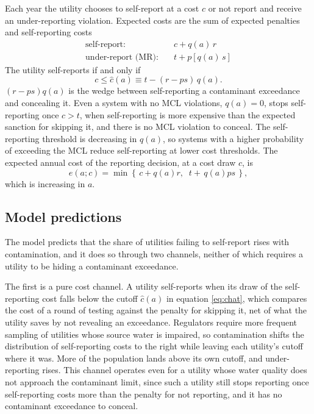 \documentclass[12pt]{article}
\begin{document}
	Each year the utility chooses to self-report at a cost $c$ or not report and receive an under-reporting violation. Expected costs are the sum of expected penalties and self-reporting costs
	\begin{align*}
		\text{self-report:} \quad & c + q(a)\,r \\
		\text{under-report (MR):} \quad & t + p\left[q(a)\,s\right]
	\end{align*}
	The utility self-reports if and only if
	\begin{equation}\label{eq:chat}
		c \le \hat{c}(a) \equiv t - (r - ps)\,q(a).
	\end{equation}
	$(r - ps)q(a)$ is the wedge between self-reporting a contaminant exceedance and concealing it. Even a system with no MCL violations, $q(a) = 0$, stops self-reporting once $c > t$, when self-reporting is more expensive than the expected sanction for skipping it, and there is no MCL violation to conceal. The self-reporting threshold is decreasing in $q(a)$, so systems with a higher probability of exceeding the MCL reduce self-reporting at lower cost thresholds. The expected annual cost of the reporting decision, at a cost draw $c$, is
	\begin{equation}\label{eq:endog_penalty}
		e(a;c) = \min\left\{\, c + q(a)r,\;\; t + \,q(a)ps \,\right\},
	\end{equation}
	which is increasing in $a$.
	
	\subsection{Model predictions}

	The model predicts that the share of utilities failing to self-report rises with contamination, and it does so through two channels, neither of which requires a utility to be hiding a contaminant exceedance.

	The first is a pure cost channel. A utility self-reports when its draw of the self-reporting cost falls below the cutoff $\hat{c}(a)$ in equation \eqref{eq:chat}, which compares the cost of a round of testing against the penalty for skipping it, net of what the utility saves by not revealing an exceedance. Regulators require more frequent sampling of utilities whose source water is impaired, so contamination shifts the distribution of self-reporting costs to the right while leaving each utility's cutoff where it was. More of the population lands above its own cutoff, and under-reporting rises. This channel operates even for a utility whose water quality does not approach the contaminant limit, since such a utility still stops reporting once self-reporting costs more than the penalty for not reporting, and it has no contaminant exceedance to conceal.
\end{document}

